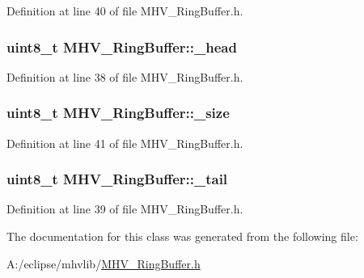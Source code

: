 Definition at line 40 of file M\-H\-V\-\_\-\-Ring\-Buffer.\-h.

\hypertarget{class_m_h_v___ring_buffer_a5e7a3df9db8af7ca9f300ad5ba3ed38d}{
\subsubsection[{\-\_\-head}]{\setlength{\rightskip}{0pt plus 5cm}uint8\-\_\-t M\-H\-V\-\_\-\-Ring\-Buffer\-::\-\_\-head\hspace{0.3cm}{\ttfamily [protected]}}}\label{class_m_h_v___ring_buffer_a5e7a3df9db8af7ca9f300ad5ba3ed38d}


Definition at line 38 of file M\-H\-V\-\_\-\-Ring\-Buffer.\-h.

\hypertarget{class_m_h_v___ring_buffer_a308a86763ef368b44faa16da65a531bb}{
\subsubsection[{\-\_\-size}]{\setlength{\rightskip}{0pt plus 5cm}uint8\-\_\-t M\-H\-V\-\_\-\-Ring\-Buffer\-::\-\_\-size\hspace{0.3cm}{\ttfamily [protected]}}}\label{class_m_h_v___ring_buffer_a308a86763ef368b44faa16da65a531bb}


Definition at line 41 of file M\-H\-V\-\_\-\-Ring\-Buffer.\-h.

\hypertarget{class_m_h_v___ring_buffer_a80432f00505b5970091a1c3aa402821d}{
\subsubsection[{\-\_\-tail}]{\setlength{\rightskip}{0pt plus 5cm}uint8\-\_\-t M\-H\-V\-\_\-\-Ring\-Buffer\-::\-\_\-tail\hspace{0.3cm}{\ttfamily [protected]}}}\label{class_m_h_v___ring_buffer_a80432f00505b5970091a1c3aa402821d}


Definition at line 39 of file M\-H\-V\-\_\-\-Ring\-Buffer.\-h.



The documentation for this class was generated from the following file\-:\begin{DoxyCompactItemize}
\item 
A\-:/eclipse/mhvlib/\hyperlink{_m_h_v___ring_buffer_8h}{M\-H\-V\-\_\-\-Ring\-Buffer.\-h}\end{DoxyCompactItemize}
